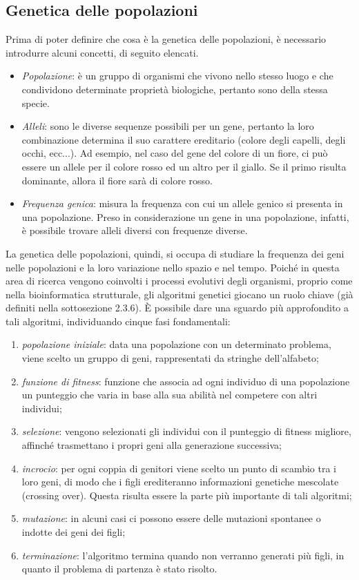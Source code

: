 \subsection{Genetica delle popolazioni}
Prima di poter definire che cosa è la genetica delle popolazioni, è necessario introdurre alcuni concetti, di seguito elencati.
\begin{itemize}
	\item \textit{Popolazione}: è un gruppo di organismi che vivono nello stesso luogo e che condividono determinate proprietà biologiche, pertanto sono della stessa specie.
	\item \textit{Alleli}: sono le diverse sequenze possibili per un gene, pertanto la loro combinazione determina il suo carattere ereditario (colore degli capelli, degli occhi, ecc...). Ad esempio, nel caso del gene del colore di un fiore, ci può essere un allele per il colore rosso ed un altro per il giallo. Se il primo risulta dominante, allora il fiore sarà di colore rosso.
	\item \textit{Frequenza genica}: misura la frequenza con cui un allele genico si presenta in una popolazione.
	\newline
	Preso in considerazione un gene in una popolazione, infatti, è possibile trovare alleli diversi con frequenze diverse.
\end{itemize}
La genetica delle popolazioni, quindi, si occupa di studiare la frequenza dei geni nelle popolazioni e la loro variazione nello spazio e nel tempo.
\newline
Poiché in questa area di ricerca vengono coinvolti i processi evolutivi degli organismi, proprio come nella bioinformatica strutturale, gli algoritmi genetici giocano un ruolo chiave (già definiti nella sottosezione 2.3.6). 
\newline
\`E possibile dare una sguardo più approfondito a tali algoritmi, individuando cinque fasi fondamentali:
\begin{enumerate}
	\item \textit{popolazione iniziale}: data una popolazione con un determinato problema, viene scelto un gruppo di geni, rappresentati da stringhe dell'alfabeto;
	\item \textit{funzione di fitness}: funzione che associa ad ogni individuo di una popolazione un punteggio che varia in base alla sua abilità nel competere con altri individui;
	\item \textit{selezione}: vengono selezionati gli individui con il punteggio di fitness migliore, affinché trasmettano i propri geni alla generazione successiva;
	\item \textit{incrocio}: per ogni coppia di genitori viene scelto un punto di scambio tra i loro geni, di modo che i figli erediteranno informazioni genetiche mescolate (crossing over). Questa risulta essere la parte più importante di tali algoritmi;
	\item \textit{mutazione}: in alcuni casi ci possono essere delle mutazioni spontanee o indotte dei geni dei figli;
	\item \textit{terminazione}: l'algoritmo termina quando non verranno generati più figli, in quanto il problema di partenza è stato risolto.
\end{enumerate}

